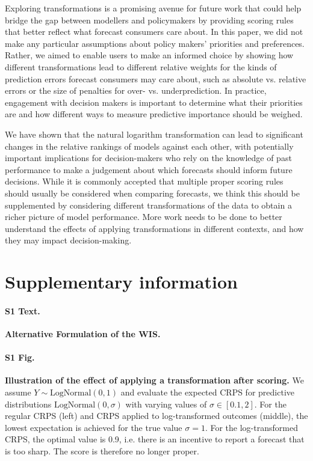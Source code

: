 \documentclass[10pt,letterpaper]{article}
\begin{document}
Exploring transformations is a promising avenue for future work that could help bridge the gap between modellers and policymakers by providing scoring rules that better reflect what forecast consumers care about. In this paper, we did not make any particular assumptions about policy makers' priorities and preferences. Rather, we aimed to enable users to make an informed choice by showing how different transformations lead to different relative weights for the kinds of prediction errors forecast consumers may care about, such as absolute vs. relative errors or the size of penalties for over- vs. underprediction. In practice, engagement with decision makers is important to determine what their priorities are and how different ways to measure predictive importance should be weighed.  

We have shown that the natural logarithm transformation can lead to significant changes in the relative rankings of models against each other, with potentially important implications for decision-makers who rely on the knowledge of past performance to make a judgement about which forecasts should inform future decisions. While it is commonly accepted that multiple proper scoring rules should usually be considered when comparing forecasts, we think this should be supplemented by considering different transformations of the data to obtain a richer picture of model performance. More work needs to be done to better understand the effects of applying transformations in different contexts, and how they may impact decision-making. 

\newpage

\appendix
\section*{Supplementary information}

\renewcommand{\thefigure}{SI.\arabic{figure}}
\setcounter{figure}{0}
\renewcommand{\thetable}{SI.\arabic{table}} \setcounter{table}{0}


\paragraph{S1 Text.}
\label{sec:alternative-wis}
\textbf{Alternative Formulation of the WIS.}

\paragraph{S1 Fig.}
\label{fig:log-improper}
\textbf{Illustration of the effect of applying a transformation after scoring. }
We assume $Y \sim \text{LogNormal}(0, 1)$ and evaluate the expected CRPS for predictive distributions $\text{LogNormal}(0, \sigma)$ with varying values of $\sigma \in [0.1, 2]$. For the regular CRPS (left) and CRPS applied to log-transformed outcomes (middle), the lowest expectation is achieved for the true value $\sigma = 1$. For the log-transformed CRPS, the optimal value is  0.9, i.e. there is an incentive to report a forecast that is too sharp. The score is therefore no longer proper.
\end{document}

